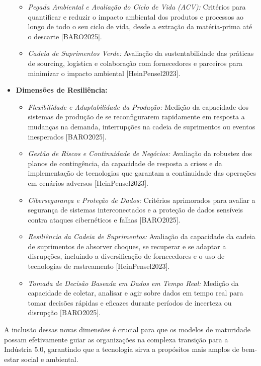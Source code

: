 \begin{itemize}
\begin{itemize}
        \item \textit{Pegada Ambiental e Avaliação do Ciclo de Vida (ACV):} Critérios para quantificar e reduzir o impacto ambiental dos produtos e processos ao longo de todo o seu ciclo de vida, desde a extração da matéria-prima até o descarte [BARO2025].
        \item \textit{Cadeia de Suprimentos Verde:} Avaliação da sustentabilidade das práticas de sourcing, logística e colaboração com fornecedores e parceiros para minimizar o impacto ambiental [HeinPensel2023].
    \end{itemize}
    \item \textbf{Dimensões de Resiliência:}
    \begin{itemize}
        \item \textit{Flexibilidade e Adaptabilidade da Produção:} Medição da capacidade dos sistemas de produção de se reconfigurarem rapidamente em resposta a mudanças na demanda, interrupções na cadeia de suprimentos ou eventos inesperados [BARO2025].
        \item \textit{Gestão de Riscos e Continuidade de Negócios:} Avaliação da robustez dos planos de contingência, da capacidade de resposta a crises e da implementação de tecnologias que garantam a continuidade das operações em cenários adversos [HeinPensel2023].
        \item \textit{Cibersegurança e Proteção de Dados:} Critérios aprimorados para avaliar a segurança de sistemas interconectados e a proteção de dados sensíveis contra ataques cibernéticos e falhas [BARO2025].
        \item \textit{Resiliência da Cadeia de Suprimentos:} Avaliação da capacidade da cadeia de suprimentos de absorver choques, se recuperar e se adaptar a disrupções, incluindo a diversificação de fornecedores e o uso de tecnologias de rastreamento [HeinPensel2023].
        \item \textit{Tomada de Decisão Baseada em Dados em Tempo Real:} Medição da capacidade de coletar, analisar e agir sobre dados em tempo real para tomar decisões rápidas e eficazes durante períodos de incerteza ou disrupção [BARO2025].
    \end{itemize}
\end{itemize}

A inclusão dessas novas dimensões é crucial para que os modelos de maturidade possam efetivamente guiar as organizações na complexa transição para a Indústria 5.0, garantindo que a tecnologia sirva a propósitos mais amplos de bem-estar social e ambiental.





